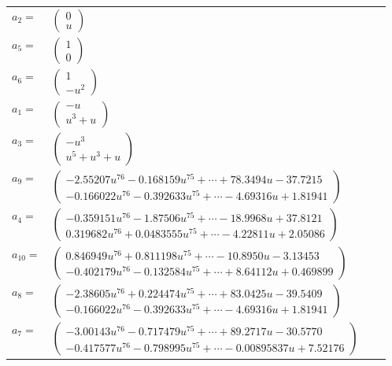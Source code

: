 \documentclass[1p]{elsarticle_modified}
\theoremstyle{definition}
\begin{document}
\begin{tabular}{m{7pt} m{180pt} m{7pt} m{180pt} }
\flushright $a_{2}=$&$\begin{pmatrix}0\\u\end{pmatrix}$ \\
\flushright $a_{5}=$&$\begin{pmatrix}1\\0\end{pmatrix}$ \\
\flushright $a_{6}=$&$\begin{pmatrix}1\\- u^2\end{pmatrix}$ \\
\flushright $a_{1}=$&$\begin{pmatrix}- u\\u^3+u\end{pmatrix}$ \\
\flushright $a_{3}=$&$\begin{pmatrix}- u^3\\u^5+u^3+u\end{pmatrix}$ \\
\flushright $a_{9}=$&$\begin{pmatrix}-2.55207 u^{76}-0.168159 u^{75}+\cdots+78.3494 u-37.7215\\-0.166022 u^{76}-0.392633 u^{75}+\cdots-4.69316 u+1.81941\end{pmatrix}$ \\
\flushright $a_{4}=$&$\begin{pmatrix}-0.359151 u^{76}-1.87506 u^{75}+\cdots-18.9968 u+37.8121\\0.319682 u^{76}+0.0483555 u^{75}+\cdots-4.22811 u+2.05086\end{pmatrix}$ \\
\flushright $a_{10}=$&$\begin{pmatrix}0.846949 u^{76}+0.811198 u^{75}+\cdots-10.8950 u-3.13453\\-0.402179 u^{76}-0.132584 u^{75}+\cdots+8.64112 u+0.469899\end{pmatrix}$ \\
\flushright $a_{8}=$&$\begin{pmatrix}-2.38605 u^{76}+0.224474 u^{75}+\cdots+83.0425 u-39.5409\\-0.166022 u^{76}-0.392633 u^{75}+\cdots-4.69316 u+1.81941\end{pmatrix}$ \\
\flushright $a_{7}=$&$\begin{pmatrix}-3.00143 u^{76}-0.717479 u^{75}+\cdots+89.2717 u-30.5770\\-0.417577 u^{76}-0.798995 u^{75}+\cdots-0.00895837 u+7.52176\end{pmatrix}$ \\

\end{tabular}
\end{document}
